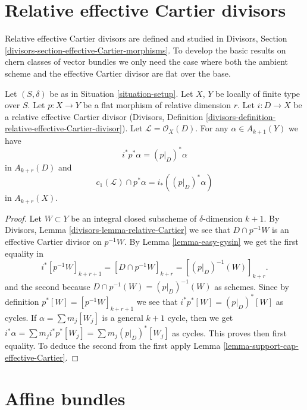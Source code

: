\section{Relative effective Cartier divisors}
\label{section-relative-effective-cartier}

\noindent
Relative effective Cartier divisors are defined and studied
in Divisors, Section \ref{divisors-section-effective-Cartier-morphisms}.
To develop the basic results on chern classes of vector bundles
we only need the case where both the ambient scheme and the effective
Cartier divisor are flat over the base.

\begin{lemma}
\label{lemma-relative-effective-cartier}
Let $(S, \delta)$ be as in Situation \ref{situation-setup}.
Let $X$, $Y$ be locally of finite type over $S$.
Let $p : X \to Y$ be a flat morphism of relative dimension $r$.
Let $i : D \to X$ be a relative effective Cartier divisor
(Divisors, Definition
\ref{divisors-definition-relative-effective-Cartier-divisor}).
Let $\mathcal{L} = \mathcal{O}_X(D)$.
For any $\alpha \in A_{k + 1}(Y)$ we have
$$
i^*p^*\alpha = (p|_D)^*\alpha
$$
in $A_{k + r}(D)$ and
$$
c_1(\mathcal{L}) \cap p^*\alpha = i_* ((p|_D)^*\alpha)
$$
in $A_{k + r}(X)$.
\end{lemma}

\begin{proof}
Let $W \subset Y$ be an integral closed subscheme of $\delta$-dimension
$k + 1$. By Divisors, Lemma \ref{divisors-lemma-relative-Cartier}
we see that $D \cap p^{-1}W$ is an effective
Cartier divisor on $p^{-1}W$. By Lemma \ref{lemma-easy-gysin}
we get the first equality in
$$
i^*[p^{-1}W]_{k + r + 1} =
[D \cap p^{-1}W]_{k + r} =
[(p|_D)^{-1}(W)]_{k + r}.
$$
and the second because $D \cap p^{-1}(W) = (p|_D)^{-1}(W)$ as schemes.
Since by definition $p^*[W] = [p^{-1}W]_{k + r + 1}$ we see that
$i^*p^*[W] = (p|_D)^*[W]$ as cycles. If $\alpha = \sum m_j[W_j]$ is a
general $k + 1$ cycle, then we get
$i^*\alpha = \sum m_j i^*p^*[W_j] = \sum m_j(p|_D)^*[W_j]$ as cycles.
This proves then first equality. To deduce the second from the
first apply Lemma \ref{lemma-support-cap-effective-Cartier}.
\end{proof}








\section{Affine bundles}
\label{section-affine-vector}

